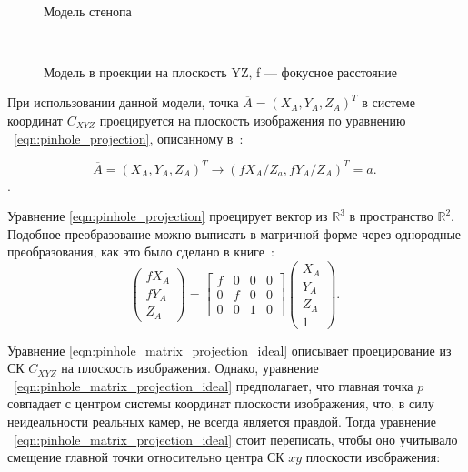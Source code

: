 \documentclass[14pt, a4paper]{extarticle}
\begin{document}
\begin{figure}[h!]
  \centering
  
  \caption{Модель стенопа}
~\label{fig:pinhole_model}
\end{figure}

\begin{figure}[h!]
  \centering
  
  \caption{Модель в проекции на плоскость YZ, f --- фокусное расстояние}
~\label{fig:pinhole_geometry}
\end{figure}

При использовании данной модели, точка $\overline{A} = (X_A, Y_A, Z_A)^T$ в
системе координат $C_{XYZ}$ проецируется на плоскость изображения по уравнению
~\eqref{eqn:pinhole_projection}, описанному в~\cite{multiview_cv}:

\begin{equation}
    \overline{A} = (X_A, Y_A, Z_A)^T \rightarrow (fX_A/Z_a, fY_A/Z_A)^T = \overline{a}.
~\label{eqn:pinhole_projection}
\end{equation}.

Уравнение \eqref{eqn:pinhole_projection} проецирует вектор из $\mathbb{R}^3$ в
пространство $\mathbb{R}^2$. Подобное преобразование можно выписать в матричной
форме через однородные преобразования, как это было сделано в книге~\cite{multiview_cv}:
\begin{equation}
    \begin{pmatrix}
        f X_A \\
        f Y_A \\
        Z_A
    \end{pmatrix} = 
    \begin{bmatrix}
        f & 0 & 0 & 0 \\
        0 & f & 0 & 0 \\
        0 & 0 & 1 & 0
    \end{bmatrix} \begin{pmatrix}
        X_A\\
        Y_A\\
        Z_A\\
        1
    \end{pmatrix}.
~\label{eqn:pinhole_matrix_projection_ideal}
\end{equation}

Уравнение \eqref{eqn:pinhole_matrix_projection_ideal} описывает проецирование из
СК $C_{XYZ}$ на плоскость изображения.  Однако, уравнение
~\eqref{eqn:pinhole_matrix_projection_ideal} предполагает, что главная точка $p$
совпадает с центром системы координат плоскости изображения, что, в силу
неидеальности реальных камер, не всегда является правдой. Тогда уравнение
~\eqref{eqn:pinhole_matrix_projection_ideal} стоит переписать, чтобы оно
учитывало смещение главной точки относительно центра СК $xy$ плоскости
изображения:
    
\end{document}
